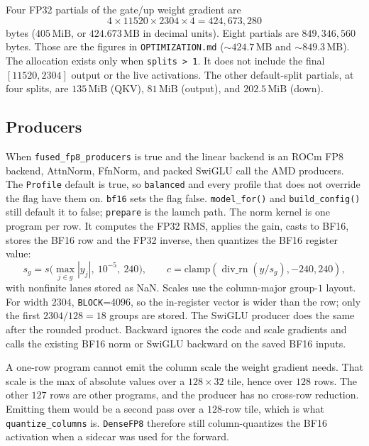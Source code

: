 \documentclass[11pt]{article}
\DeclareRobustCommand{\code}[1]{\texttt{#1}}
\newcommand{\rne}{\operatorname{div\_rn}}
\newcommand{\MiB}{\,\mathrm{MiB}}
\begin{document}
Four FP32 partials of the gate/up weight gradient are
\begin{equation}
4\times 11520\times 2304\times 4 = 424{,}673{,}280
\end{equation}
bytes (\(405\MiB\), or \(424.673\,\mathrm{MB}\) in decimal units). Eight
partials are \(849{,}346{,}560\) bytes. Those are the figures in
\code{OPTIMIZATION.md} (\(\sim 424.7\,\mathrm{MB}\) and
\(\sim 849.3\,\mathrm{MB}\)). The allocation exists only when
\code{splits > 1}. It does not include the final \([11520,2304]\) output or
the live activations. The other default-split partials, at four splits, are
\(135\MiB\) (QKV), \(81\MiB\) (output), and \(202.5\MiB\) (down).

\subsection{Producers}

When \code{fused\_fp8\_producers} is true and the linear backend is an ROCm
FP8 backend, AttnNorm, FfnNorm, and packed SwiGLU call the AMD producers.
The \code{Profile} default is true, so \code{balanced} and every profile
that does not override the flag have them on. \code{bf16} sets the flag
false. \code{model\_for()} and \code{build\_config()} still default it to
false; \code{prepare} is the launch path. The norm kernel is one
program per row. It computes the FP32 RMS, applies the gain, casts to BF16,
stores the BF16 row and the FP32 inverse, then quantizes the BF16 register
value:
\begin{equation}
s_g = s\big(\max_{j\in g}|y_j|,\ 10^{-5},\ 240\big),
\qquad
c = \mathrm{clamp}(\rne(y/s_g),-240,240),
\end{equation}
with nonfinite lanes stored as NaN. Scales use the column-major group-\(1\)
layout. For width \(2304\), \code{BLOCK}=4096, so the in-register vector is
wider than the row; only the first \(2304/128=18\) groups are stored. The
SwiGLU producer does the same after the rounded product. Backward ignores
the code and scale gradients and calls the existing BF16 norm or SwiGLU
backward on the saved BF16 inputs.

A one-row program cannot emit the column scale the weight gradient needs.
That scale is the max of absolute values over a \(128\times 32\) tile, hence
over \(128\) rows. The other \(127\) rows are other programs, and the
producer has no cross-row reduction. Emitting them would be a second pass
over a \(128\)-row tile, which is what \code{quantize\_columns} is.
\code{DenseFP8} therefore still column-quantizes the BF16 activation when a
sidecar was used for the forward.
\end{document}
